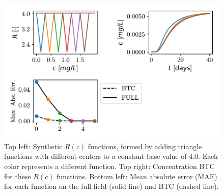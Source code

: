 \begin{figure}[h]
    \centering
    \includegraphics{figs/triangle_ret_pertubation.pdf}
    \caption{Top left: Synthetic $R(c)$ functions, formed by adding triangle functions with different centers to a constant base value of 4.0. Each color represents a different function. Top right: Concentration BTC for these $R(c)$ functions. Bottom left: Mean absolute error (MAE) for each function on the full field (solid line) and BTC (dashed line).}
    \label{fig:triangle_ret_pertubation}
\end{figure}
